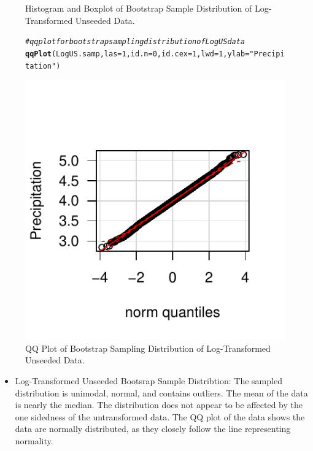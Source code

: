 \documentclass{article}\usepackage[]{graphicx}\usepackage[]{color}
\makeatletter
\def\maxwidth{ %
  \ifdim\Gin@nat@width>\linewidth
    \linewidth
  \else
    \Gin@nat@width
  \fi
}
\newcommand{\hlnum}[1]{\textcolor[rgb]{0.686,0.059,0.569}{#1}}%
\newcommand{\hlstr}[1]{\textcolor[rgb]{0.192,0.494,0.8}{#1}}%
\newcommand{\hlcom}[1]{\textcolor[rgb]{0.678,0.584,0.686}{\textit{#1}}}%
\newcommand{\hlstd}[1]{\textcolor[rgb]{0.345,0.345,0.345}{#1}}%
\newcommand{\hlkwc}[1]{\textcolor[rgb]{0.333,0.667,0.333}{#1}}%
\newcommand{\hlkwd}[1]{\textcolor[rgb]{0.737,0.353,0.396}{\textbf{#1}}}%
\newenvironment{kframe}{%
 \def\at@end@of@kframe{}%
 \ifinner\ifhmode%
  \def\at@end@of@kframe{\end{minipage}}%
  \begin{minipage}{\columnwidth}%
 \fi\fi%
 \def\FrameCommand##1{\hskip\@totalleftmargin \hskip-\fboxsep
 \colorbox{shadecolor}{##1}\hskip-\fboxsep
     \hskip-\linewidth \hskip-\@totalleftmargin \hskip\columnwidth}%
 \MakeFramed {\advance\hsize-\width
   \@totalleftmargin\z@ \linewidth\hsize
   \@setminipage}}%
 {\par\unskip\endMakeFramed%
 \at@end@of@kframe}
\newenvironment{knitrout}{}{} %
\makeatother
\begin{document}
\begin{figure}[H]
\begin{center}
\begin{knitrout}
\end{knitrout}
\end{center}\caption{Histogram and Boxplot of Bootstrap Sample Distribution of Log-Transformed Unseeded Data.} \end{figure}

\begin{figure}[H]  \begin{center}
\begin{knitrout}
\color{fgcolor}\begin{kframe}
\begin{alltt}
\hlcom{# qq plot for bootstrap sampling distribution of LogUS data}
\hlkwd{qqPlot}\hlstd{(LogUS.samp,} \hlkwc{las} \hlstd{=} \hlnum{1}\hlstd{,} \hlkwc{id.n} \hlstd{=} \hlnum{0}\hlstd{,} \hlkwc{id.cex} \hlstd{=} \hlnum{1}\hlstd{,} \hlkwc{lwd} \hlstd{=} \hlnum{1}\hlstd{,} \hlkwc{ylab} \hlstd{=} \hlstr{"Precipitation"}\hlstd{)}
\end{alltt}
\end{kframe}
\includegraphics[width=\maxwidth]{figure/1a_qq_LogUSsamp} 

\end{knitrout}
\end{center} \caption{QQ Plot of Bootstrap Sampling Distribution of Log-Transformed Unseeded Data.} \end{figure}

\begin{itemize}
\item Log-Transformed Unseeded Bootsrap Sample Distribtion:  The sampled distribution is unimodal, normal, and contains outliers.  The mean of the data is nearly the median.  The distribution does not appear to be affected by the one sidedness of the untransformed data. The QQ plot of the data shows  the data are normally distributed, as they closely follow the line representing normality.
\end{itemize}
\end{document}
